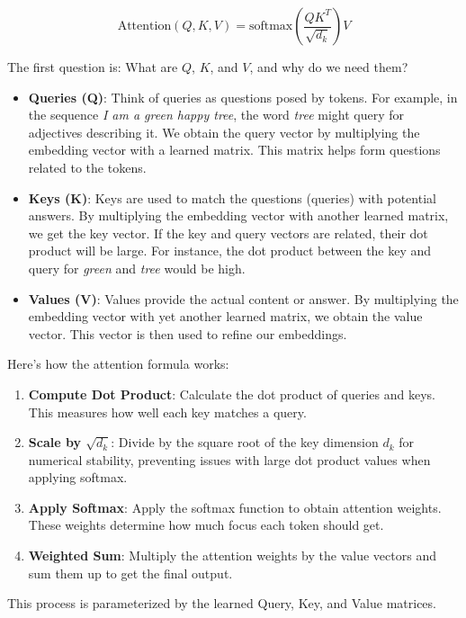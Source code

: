 \documentclass[a4paper]{article}
\begin{document}
\[ \text{Attention}(Q, K, V) = \text{softmax}\left(\frac{QK^T}{\sqrt{d_k}}\right)V \]

The first question is: What are \(Q\), \(K\), and \(V\), and why do we need them?

\begin{itemize}
    \item \textbf{Queries (Q)}: Think of queries as questions posed by tokens. For example, in the sequence \textit{I am a green happy tree}, the word \textit{tree} might query for adjectives describing it. We obtain the query vector by multiplying the embedding vector with a learned matrix. This matrix helps form questions related to the tokens.
    
    \item \textbf{Keys (K)}: Keys are used to match the questions (queries) with potential answers. By multiplying the embedding vector with another learned matrix, we get the key vector. If the key and query vectors are related, their dot product will be large. For instance, the dot product between the key and query for \textit{green} and \textit{tree} would be high.
    
    \item \textbf{Values (V)}: Values provide the actual content or answer. By multiplying the embedding vector with yet another learned matrix, we obtain the value vector. This vector is then used to refine our embeddings.
\end{itemize}

Here’s how the attention formula works:

\begin{enumerate}
    \item \textbf{Compute Dot Product}: Calculate the dot product of queries and keys. This measures how well each key matches a query.
    \item \textbf{Scale by \( \sqrt{d_k} \)}: Divide by the square root of the key dimension \( d_k \) for numerical stability, preventing issues with large dot product values when applying softmax.
    \item \textbf{Apply Softmax}: Apply the softmax function to obtain attention weights. These weights determine how much focus each token should get.
    \item \textbf{Weighted Sum}: Multiply the attention weights by the value vectors and sum them up to get the final output.
\end{enumerate}

This process is parameterized by the learned Query, Key, and Value matrices.
\end{document}
